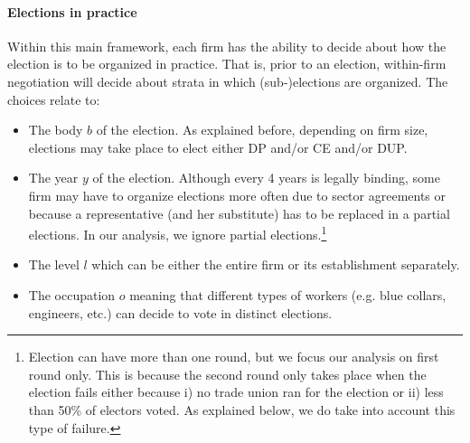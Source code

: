 \paragraph{Elections in practice}

Within this main framework, each firm has the ability to decide about how the election is to be organized in practice. That is, prior to an election, within-firm negotiation will decide about strata in which (sub-)elections are organized. The choices relate to:
\begin{itemize}
\item[-] The body $b$ of the election. As explained before, depending on firm size, elections may take place to elect either DP and/or CE and/or DUP.
\item[-] The year $y$ of the election. Although every 4 years is legally binding, some firm may have to organize elections more often due to sector agreements or because a representative (and her substitute) has to be replaced in a partial elections. In our analysis, we ignore partial elections.\footnote{Election can have more than one round, but we focus our analysis on first round only. This is because the second round only takes place when the election fails either because i) no trade union ran for the election or ii) less than 50\% of electors voted. As explained below, we do take into account this type of failure.}
\item[-] The level $l$ which can be either the entire firm or its establishment separately.
\item[-] The occupation $o$ meaning that different types of workers (e.g. blue collars, engineers, etc.) can decide to vote in distinct elections.
\end{itemize}

